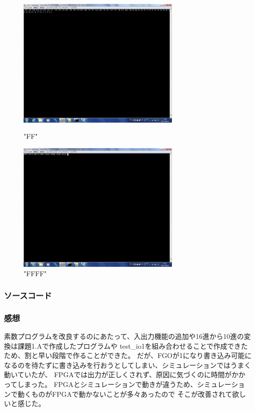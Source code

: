 \documentclass{jsarticle}
\begin{document}
\begin{figure}[htbp]
 \begin{minipage}{0.5\hsize}
  \begin{center}
  \includegraphics[width=8cm,bb=0 0 1280 1024]{FFout.png}
  \end{center}
  \caption{"FF"}
 \end{minipage}
 \begin{minipage}{0.5\hsize}
  \begin{center}
   \includegraphics[width=8cm,bb=0 0 1280 1024]{FFFFinout.png}
  \end{center}
  \caption{"FFFF"}
 \end{minipage}
\end{figure}

\newpage

\subsubsection*{ソースコード}



\subsubsection*{感想}
素数プログラムを改良するのにあたって、入出力機能の追加や16進から10進の変換は課題1.Aで作成したプログラムや
test\_io1を組み合わせることで作成できたため、割と早い段階で作ることができた。
だが、FGOが1になり書き込み可能になるのを待たずに書き込みを行おうとしてしまい、シミュレーションではうまく動いていたが、
FPGAでは出力が正しくされず、原因に気づくのに時間がかかってしまった。
FPGAとシミュレーションで動きが違うため、シミュレーションで動くものがFPGAで動かないことが多々あったので
そこが改善されて欲しいと感じた。
\end{document}
